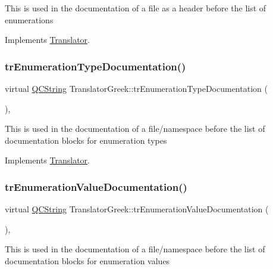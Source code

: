 This is used in the documentation of a file as a header before the list of enumerations 

Implements \mbox{\hyperlink{class_translator}{Translator}}.

\mbox{\label{class_translator_greek_af3c34fa216232353568ce0b9fd902aa5}} 
\subsubsection{\texorpdfstring{trEnumerationTypeDocumentation()}{trEnumerationTypeDocumentation()}}
{\footnotesize\ttfamily virtual \mbox{\hyperlink{class_q_c_string}{Q\+C\+String}} Translator\+Greek\+::tr\+Enumeration\+Type\+Documentation (\begin{DoxyParamCaption}{ }\end{DoxyParamCaption})\hspace{0.3cm}{\ttfamily [inline]}, {\ttfamily [virtual]}}

This is used in the documentation of a file/namespace before the list of documentation blocks for enumeration types 

Implements \mbox{\hyperlink{class_translator}{Translator}}.

\mbox{\label{class_translator_greek_a2cf94f7118f6f7a7cca9e4b74de74633}} 
\subsubsection{\texorpdfstring{trEnumerationValueDocumentation()}{trEnumerationValueDocumentation()}}
{\footnotesize\ttfamily virtual \mbox{\hyperlink{class_q_c_string}{Q\+C\+String}} Translator\+Greek\+::tr\+Enumeration\+Value\+Documentation (\begin{DoxyParamCaption}{ }\end{DoxyParamCaption})\hspace{0.3cm}{\ttfamily [inline]}, {\ttfamily [virtual]}}

This is used in the documentation of a file/namespace before the list of documentation blocks for enumeration values 

